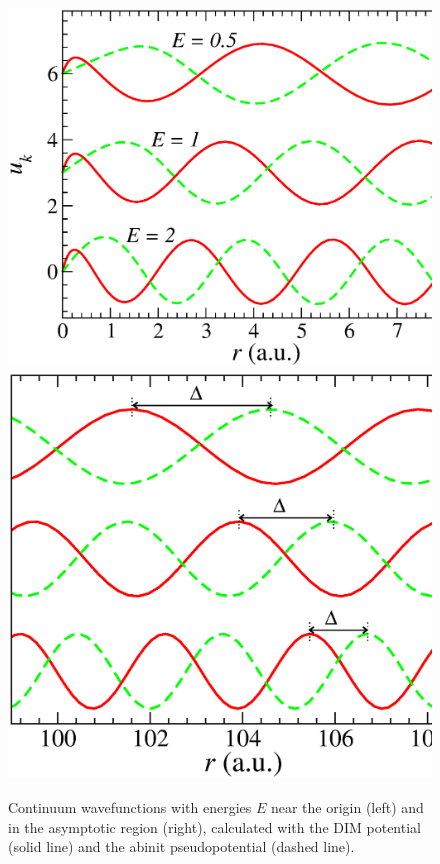 \documentclass[10pt]{article}
\begin{document}
\begin{figure}[H]
\centering
\includegraphics[height=0.23\textheight]{figures/pseudopot/LicontA.eps}
\includegraphics[height=0.23\textheight]{figures/pseudopot/LicontB.eps}
 \caption{Continuum wavefunctions with energies $E$ near the origin 
 (left) and in the asymptotic region (right), calculated with the 
 DIM potential (solid line) and the {\sc abinit} pseudopotential 
 (dashed line).}
 \label{fig:contLi}
\end{figure}
\end{document}
